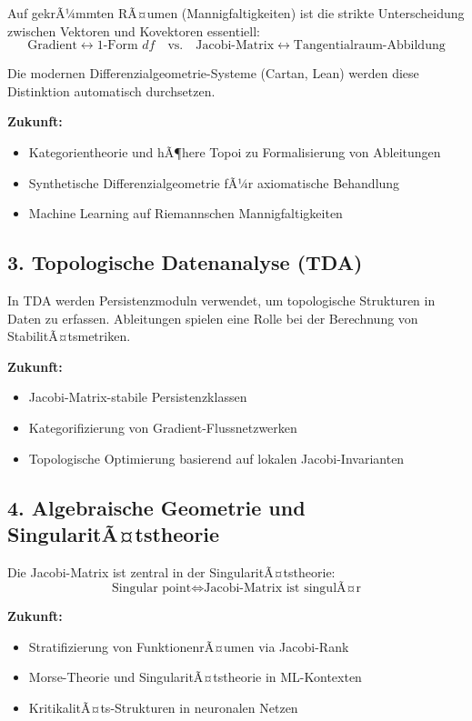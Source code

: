 ﻿\documentclass[a4paper,12pt]{article}
\theoremstyle{definition}
\begin{document}
Auf gekrÃ¼mmten RÃ¤umen (Mannigfaltigkeiten) ist die strikte Unterscheidung zwischen Vektoren und Kovektoren essentiell:
\[
\text{Gradient} \leftrightarrow \text{1-Form } df \quad \text{vs.} \quad \text{Jacobi-Matrix} \leftrightarrow \text{Tangentialraum-Abbildung}
\]

Die modernen Differenzialgeometrie-Systeme (Cartan, Lean) werden diese Distinktion automatisch durchsetzen.

\textbf{Zukunft:}
\begin{itemize}
	\item Kategorientheorie und hÃ¶here Topoi zu Formalisierung von Ableitungen
	\item Synthetische Differenzialgeometrie fÃ¼r axiomatische Behandlung
	\item Machine Learning auf Riemannschen Mannigfaltigkeiten
\end{itemize}

\subsection{3. Topologische Datenanalyse (TDA)}

In TDA werden Persistenzmoduln verwendet, um topologische Strukturen in Daten zu erfassen. Ableitungen spielen eine Rolle bei der Berechnung von StabilitÃ¤tsmetriken.

\textbf{Zukunft:}
\begin{itemize}
	\item Jacobi-Matrix-stabile Persistenzklassen
	\item Kategorifizierung von Gradient-Flussnetzwerken
	\item Topologische Optimierung basierend auf lokalen Jacobi-Invarianten
\end{itemize}

\subsection{4. Algebraische Geometrie und SingularitÃ¤tstheorie}

Die Jacobi-Matrix ist zentral in der SingularitÃ¤tstheorie:
\[
\text{Singular point} \iff \text{Jacobi-Matrix ist singulÃ¤r}
\]

\textbf{Zukunft:}
\begin{itemize}
	\item Stratifizierung von FunktionenrÃ¤umen via Jacobi-Rank
	\item Morse-Theorie und SingularitÃ¤tstheorie in ML-Kontexten
	\item KritikalitÃ¤ts-Strukturen in neuronalen Netzen
\end{itemize}
\end{document}
